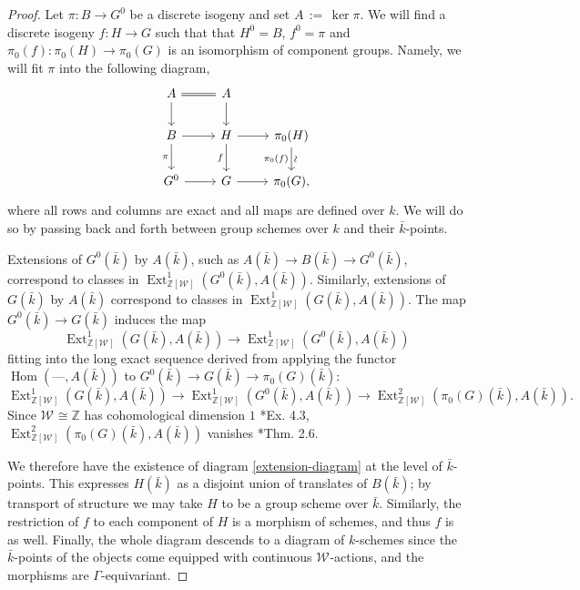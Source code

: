 \documentclass[11pt]{amsart}
\theoremstyle{plain}
\theoremstyle{definition}
\theoremstyle{remark}
\newcommand{\ZZ}{{\mathbb{Z}}}
\newcommand{\bFq}{\bar{k}}
\newcommand{\Fq}{k}
\DeclareMathOperator{\Hom}{Hom}
\DeclareMathOperator{\Ext}{Ext}
\newcommand{\ceq}{{\, :=\, }}
\newcommand{\Weil}[1]{\mathcal{W}_{#1}}
\begin{document}
\begin{proof}
Let $\pi: B \to G^0$ be a discrete isogeny and set $A \ceq \ker \pi$.
  We will find a discrete isogeny $f: H\to G$
  such that that $H^0 = B$, $f^0 =\pi$ and
  $\pi_0(f) : \pi_0(H)\to \pi_0(G)$ is an isomorphism of component
  groups.  Namely, we will fit $\pi$ into the following diagram,
  \begin{equation}\label{extension-diagram}
  \begin{tikzcd}
  A \arrow[equal]{r} \dar & A \dar \\
  B \rar \dar[swap]{\pi} & H \rar \dar[swap]{f} & \pi_0(H) \arrow{d}[below,rotate=90]{\sim}[swap]{\pi_0(f)} \\
  G^0 \rar & G \rar & \pi_0(G),
  \end{tikzcd}
  \end{equation}
  where all rows and columns are exact and all maps are defined over
  $\Fq$.  We will do so by passing back and forth between group
  schemes over $\Fq$ and their $\bFq$-points.  
  
  Extensions of $G^0(\bFq)$ by $A(\bFq)$, such as $A(\bFq) \to B(\bFq) \to G^0(\bFq)$,
  correspond to classes in $\Ext^1_{\ZZ[\Weil{}]}(G^0(\bFq), A(\bFq))$.
  Similarly, extensions of $G(\bFq)$ by $A(\bFq)$ correspond to
  classes in $\Ext^1_{\ZZ[\Weil{}]}(G(\bFq), A(\bFq))$.  The map
  $G^0(\bFq) \to G(\bFq)$ induces the map
  \[
  \Ext^1_{\ZZ[\Weil{}]}(G(\bFq), A(\bFq)) \to \Ext^1_{\ZZ[\Weil{}]}(G^0(\bFq), A(\bFq))
  \]
  fitting into the long exact sequence derived from applying
  the functor $\Hom(\mbox{---}, A(\bFq))$ to $G^0(\bFq) \to G(\bFq) \to \pi_0(G)(\bFq)$:
  \[
  \Ext^1_{\ZZ[\Weil{}]}(G(\bFq), A(\bFq)) \to \Ext^1_{\ZZ[\Weil{}]}(G^0(\bFq), A(\bFq)) \to \Ext^2_{\ZZ[\Weil{}]}(\pi_0(G)(\bFq), A(\bFq)).
  \]
  Since $\Weil{} \cong \ZZ$ has cohomological dimension $1$ \cite{brown:CohomologyGrps}*{Ex. 4.3},
  $\Ext^2_{\ZZ[\Weil{}]}(\pi_0(G)(\bFq), A(\bFq))$ vanishes \cite{cartan-eilenberg:HomologicalAlgebra}*{Thm. 2.6}.

  We therefore have the existence of diagram \eqref{extension-diagram}
  at the level of $\bFq$-points.  This expresses $H(\bFq)$ as a
  disjoint union of translates of $B(\bFq)$; by transport of structure
  we may take $H$ to be a group scheme over $\bFq$.  Similarly, the
  restriction of $f$ to each component of $H$ is a morphism of
  schemes, and thus $f$ is as well.  Finally, the whole diagram
  descends to a diagram of $\Fq$-schemes since the $\bFq$-points of
  the objects come equipped with continuous $\Weil{}$-actions, and the
  morphisms are $\Gamma$-equivariant.
\end{proof}
\end{document}
